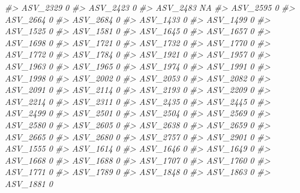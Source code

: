 \documentclass[
]{article}
\newenvironment{Shaded}{\begin{snugshade}}{\end{snugshade}}
\newcommand{\CommentTok}[1]{\textcolor[rgb]{0.56,0.35,0.01}{\textit{#1}}}
\begin{document}
\begin{Shaded}
\begin{Highlighting}[]
\CommentTok{\#\textgreater{} ASV\_2329  0}
\CommentTok{\#\textgreater{} ASV\_2423  0}
\CommentTok{\#\textgreater{} ASV\_2483 NA}
\CommentTok{\#\textgreater{} ASV\_2595  0}
\CommentTok{\#\textgreater{} ASV\_2664  0}
\CommentTok{\#\textgreater{} ASV\_2684  0}
\CommentTok{\#\textgreater{} ASV\_1433  0}
\CommentTok{\#\textgreater{} ASV\_1499  0}
\CommentTok{\#\textgreater{} ASV\_1525  0}
\CommentTok{\#\textgreater{} ASV\_1581  0}
\CommentTok{\#\textgreater{} ASV\_1645  0}
\CommentTok{\#\textgreater{} ASV\_1657  0}
\CommentTok{\#\textgreater{} ASV\_1698  0}
\CommentTok{\#\textgreater{} ASV\_1721  0}
\CommentTok{\#\textgreater{} ASV\_1732  0}
\CommentTok{\#\textgreater{} ASV\_1770  0}
\CommentTok{\#\textgreater{} ASV\_1772  0}
\CommentTok{\#\textgreater{} ASV\_1784  0}
\CommentTok{\#\textgreater{} ASV\_1921  0}
\CommentTok{\#\textgreater{} ASV\_1957  0}
\CommentTok{\#\textgreater{} ASV\_1963  0}
\CommentTok{\#\textgreater{} ASV\_1965  0}
\CommentTok{\#\textgreater{} ASV\_1974  0}
\CommentTok{\#\textgreater{} ASV\_1991  0}
\CommentTok{\#\textgreater{} ASV\_1998  0}
\CommentTok{\#\textgreater{} ASV\_2002  0}
\CommentTok{\#\textgreater{} ASV\_2053  0}
\CommentTok{\#\textgreater{} ASV\_2082  0}
\CommentTok{\#\textgreater{} ASV\_2091  0}
\CommentTok{\#\textgreater{} ASV\_2114  0}
\CommentTok{\#\textgreater{} ASV\_2193  0}
\CommentTok{\#\textgreater{} ASV\_2209  0}
\CommentTok{\#\textgreater{} ASV\_2214  0}
\CommentTok{\#\textgreater{} ASV\_2311  0}
\CommentTok{\#\textgreater{} ASV\_2435  0}
\CommentTok{\#\textgreater{} ASV\_2445  0}
\CommentTok{\#\textgreater{} ASV\_2499  0}
\CommentTok{\#\textgreater{} ASV\_2501  0}
\CommentTok{\#\textgreater{} ASV\_2504  0}
\CommentTok{\#\textgreater{} ASV\_2569  0}
\CommentTok{\#\textgreater{} ASV\_2580  0}
\CommentTok{\#\textgreater{} ASV\_2605  0}
\CommentTok{\#\textgreater{} ASV\_2638  0}
\CommentTok{\#\textgreater{} ASV\_2659  0}
\CommentTok{\#\textgreater{} ASV\_2665  0}
\CommentTok{\#\textgreater{} ASV\_2680  0}
\CommentTok{\#\textgreater{} ASV\_2757  0}
\CommentTok{\#\textgreater{} ASV\_2901  0}
\CommentTok{\#\textgreater{} ASV\_1555  0}
\CommentTok{\#\textgreater{} ASV\_1614  0}
\CommentTok{\#\textgreater{} ASV\_1646  0}
\CommentTok{\#\textgreater{} ASV\_1649  0}
\CommentTok{\#\textgreater{} ASV\_1668  0}
\CommentTok{\#\textgreater{} ASV\_1688  0}
\CommentTok{\#\textgreater{} ASV\_1707  0}
\CommentTok{\#\textgreater{} ASV\_1760  0}
\CommentTok{\#\textgreater{} ASV\_1771  0}
\CommentTok{\#\textgreater{} ASV\_1789  0}
\CommentTok{\#\textgreater{} ASV\_1848  0}
\CommentTok{\#\textgreater{} ASV\_1863  0}
\CommentTok{\#\textgreater{} ASV\_1881  0}

\end{Highlighting}
\end{Shaded}
\end{document}
